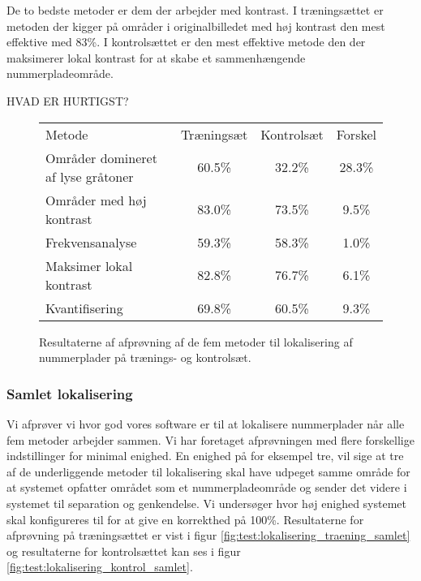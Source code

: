De to bedste metoder er dem der arbejder med kontrast. I træningsættet er metoden der kigger på områder i originalbilledet med høj kontrast den mest effektive med 83\%. I kontrolsættet er den mest effektive metode den der maksimerer lokal kontrast for at skabe et sammenhængende nummerpladeområde. 

HVAD ER HURTIGST?

\begin{figure}[htp]
\centering
\begin{tabular}{|l|c|c|c|}
\hline
\rowcolor[gray]{0.9} \multicolumn{4}{|>{\columncolor[gray]{0.9}}c|}{\textbf{Individuelle metoder til lokalisering}} \\ \hline
Metode & Træningsæt & Kontrolsæt & Forskel \\ \hline
Områder domineret af lyse gråtoner & 60.5\% & 32.2\% & 28.3\% \\ \hline
Områder med høj kontrast           & 83.0\% & 73.5\% &  9.5\% \\ \hline
Frekvensanalyse                    & 59.3\% & 58.3\% &  1.0\% \\ \hline
Maksimer lokal kontrast            & 82.8\% & 76.7\% &  6.1\% \\ \hline
Kvantifisering                     & 69.8\% & 60.5\% &  9.3\% \\ \hline
\end{tabular}
\caption{Resultaterne af afprøvning af de fem metoder til lokalisering af nummerplader på trænings- og kontrolsæt.}
\label{fig:test:lokalisering_traening_kontrol}
\end{figure}


\subsubsection{Samlet lokalisering}
Vi afprøver vi hvor god vores software er til at lokalisere nummerplader når alle fem metoder arbejder sammen. Vi har foretaget afprøvningen med flere forskellige indstillinger for minimal enighed. En enighed på for eksempel tre, vil sige at tre af de underliggende metoder til lokalisering skal have udpeget samme område for at systemet opfatter området som et nummerpladeområde og sender det videre i systemet til separation og genkendelse. Vi undersøger hvor høj enighed systemet skal konfigureres til for at give en korrekthed på 100\%. Resultaterne for afprøvning på træningsættet er vist i figur \vref{fig:test:lokalisering_traening_samlet} og resultaterne for kontrolsættet kan ses i figur \ref{fig:test:lokalisering_kontrol_samlet}.


